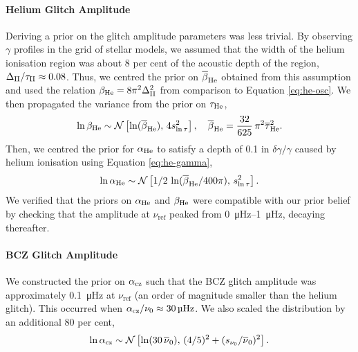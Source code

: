 \paragraph{Helium Glitch Amplitude} Deriving a prior on the glitch amplitude parameters was less trivial. By observing \(\gamma\) profiles in the grid of stellar models, we assumed that the width of the helium ionisation region was about 8 per cent of the acoustic depth of the region, \(\Delta_{{\mathrm{II}}}/\tau_{{\mathrm{II}}} \approx 0.08\). Thus, we centred the prior on \(\overline{\beta}_{{\mathrm{He}}}\) obtained from this assumption and used the relation \(\beta_{{\mathrm{He}}} = 8\pi^2\Delta_{{\mathrm{II}}}^2\) from comparison to Equation \ref{eq:he-osc}. We then propagated the variance from the prior on \(\tau_{{\mathrm{He}}}\),
%
\begin{equation}
    \ln\beta_{{\mathrm{He}}} \sim \mathcal{N}\left[ \ln(\overline{\beta}_{{\mathrm{He}}}), \, 4 s_{\ln\tau}^2 \right], \quad \overline{\beta}_{{\mathrm{He}}} = \frac{32}{625} \, \pi^2 \overline{\tau}_{{\mathrm{He}}}^2.
\end{equation}
%
Then, we centred the prior for \(\alpha_{{\mathrm{He}}}\) to satisfy a depth of 0.1 in \(\delta\gamma/\gamma\) caused by helium ionisation using Equation \ref{eq:he-gamma},
%
\begin{gather*}
    \ln\alpha_{{\mathrm{He}}} \sim \mathcal{N}\left[ 1/2 \, \ln({\overline{\beta}_{{\mathrm{He}}}}/{400\pi}), \, s_{\ln\tau}^2 \right].
\end{gather*}
%
We verified that the priors on \(\alpha_{{\mathrm{He}}}\) and \(\beta_{{\mathrm{He}}}\) were compatible with our prior belief by checking that the amplitude at \(\nu_\mathrm{ref}\) peaked from \SIrange{0}{1}{\micro\hertz}, decaying thereafter.

\paragraph{BCZ Glitch Amplitude} We constructed the prior on \(\alpha_{{\mathrm{cz}}}\) such that the BCZ glitch amplitude was approximately \SI{0.1}{\micro\hertz} at \(\nu_\mathrm{ref}\) (an order of magnitude smaller than the helium glitch). This occurred when \(\alpha_{{\mathrm{cz}}}/\nu_0 \approx \SI{30}{\micro\hertz}\). We also scaled the distribution by an additional 80 per cent,
%
\begin{equation*}
    \ln\alpha_{{\mathrm{cz}}} \sim \mathcal{N}\left[ \ln(30\,\overline{\nu}_0), \, (4/5)^2 + (s_{\nu_0}/\overline{\nu}_0)^2\right].
\end{equation*}
%

%     

